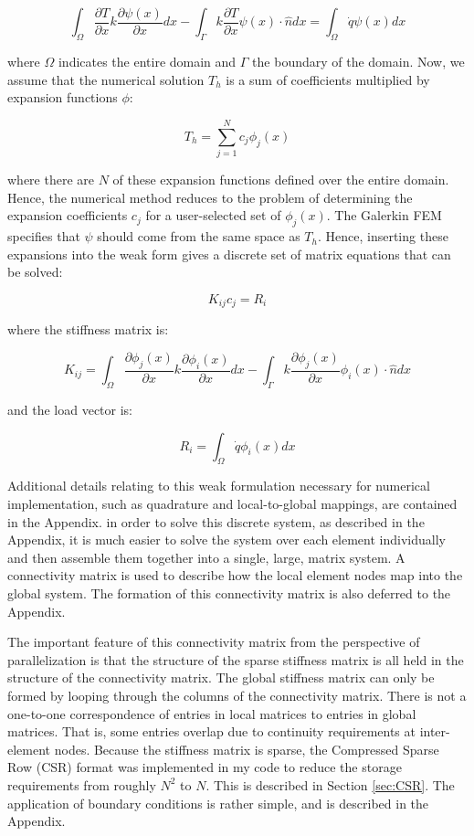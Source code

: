\documentclass[10pt]{article}
\newcommand{\beq}{\begin{equation}}
\newcommand{\eeq}{\end{equation}}
\begin{document}
\beq
\int_{\Omega}\frac{\partial T}{\partial x}k\frac{\partial\psi(x)}{\partial x}dx-\int_{\Gamma}k\frac{\partial T}{\partial x}\psi(x)\cdot\hat{n}dx=\int_{\Omega}\dot{q}\psi(x)dx
\eeq

where \(\Omega\) indicates the entire domain and \(\Gamma\) the boundary of the domain. Now, we assume that the numerical solution \(T_h\) is a sum of coefficients multiplied by expansion functions \(\phi\):

\beq
T_h=\sum_{j=1}^{N}c_j\phi_j(x)
\eeq

where there are \(N\) of these expansion functions defined over the entire domain. Hence, the numerical method reduces to the problem of determining the expansion coefficients \(c_j\) for a user-selected set of \(\phi_j(x)\). The Galerkin FEM specifies that \(\psi\) should come from the same space as \(T_h\). Hence, inserting these expansions into the weak form gives a discrete set of matrix equations that can be solved:

\beq
K_{ij}c_j=R_i
\eeq

where the stiffness matrix is:

\beq
\label{eq:k}
K_{ij}=\int_{\Omega}\frac{\partial \phi_j(x)}{\partial x}k\frac{\partial\phi_i(x)}{\partial x}dx-\int_{\Gamma}k\frac{\partial \phi_j(x)}{\partial x}\phi_i(x)\cdot\hat{n}dx
\eeq

and the load vector is:

\beq
R_{i}=\int_{\Omega}\dot{q}\phi_i(x)dx
\eeq

Additional details relating to this weak formulation necessary for numerical implementation, such as quadrature and local-to-global mappings, are contained in the Appendix. in order to solve this discrete system, as described in the Appendix, it is much easier to solve the system over each element individually and then assemble them together into a single, large, matrix system. A connectivity matrix is used to describe how the local element nodes map into the global system. The formation of this connectivity matrix is also deferred to the Appendix. 

The important feature of this connectivity matrix from the perspective of parallelization is that the structure of the sparse stiffness matrix is all held in the structure of the connectivity matrix. The global stiffness matrix can only be formed by looping through the columns of the connectivity matrix. There is not a one-to-one correspondence of entries in local matrices to entries in global matrices. That is, some entries overlap due to continuity requirements at inter-element nodes. Because the stiffness matrix is sparse, the Compressed Sparse Row (CSR) format was implemented in my code to reduce the storage requirements from roughly \(N^2\) to \(N\). This is described in Section \ref{sec:CSR}. The application of boundary conditions is rather simple, and is described in the Appendix.
\end{document}
